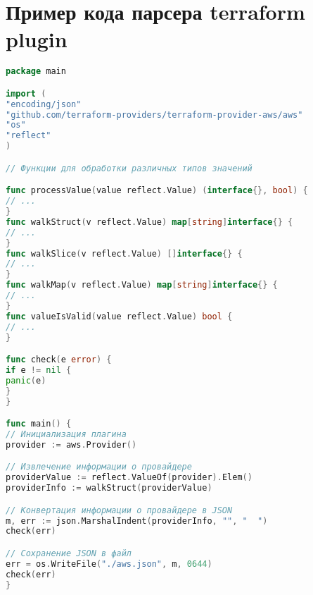 \chapter{Пример кода парсера terraform plugin}\label{sec:appendix1}

\begin{lstlisting}[language=Go]
package main

import (
"encoding/json"
"github.com/terraform-providers/terraform-provider-aws/aws"
"os"
"reflect"
)

// Функции для обработки различных типов значений

func processValue(value reflect.Value) (interface{}, bool) {
// ...
}
func walkStruct(v reflect.Value) map[string]interface{} {
// ...
}
func walkSlice(v reflect.Value) []interface{} {
// ...
}
func walkMap(v reflect.Value) map[string]interface{} {
// ...
}
func valueIsValid(value reflect.Value) bool {
// ...
}

func check(e error) {
if e != nil {
panic(e)
}
}

func main() {
// Инициализация плагина
provider := aws.Provider()

// Извлечение информации о провайдере
providerValue := reflect.ValueOf(provider).Elem()
providerInfo := walkStruct(providerValue)

// Конвертация информации о провайдере в JSON
m, err := json.MarshalIndent(providerInfo, "", "  ")
check(err)

// Сохранение JSON в файл
err = os.WriteFile("./aws.json", m, 0644)
check(err)
}
\end{lstlisting}